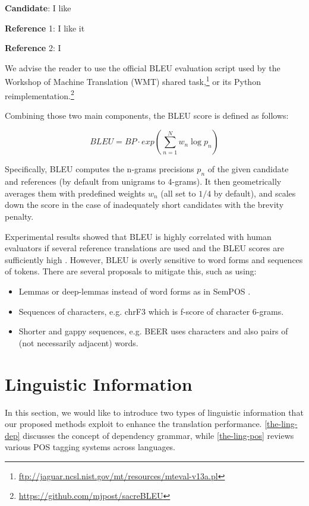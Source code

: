 \bigskip

\textbf{Candidate}: I like

\textbf{Reference} 1: I like it

\textbf{Reference} 2: I

\bigskip

We advise the reader to use the official BLEU evaluation script used by the Workshop of Machine Translation (WMT) shared task,\footnote{\url{ftp://jaguar.ncsl.nist.gov/mt/resources/mteval-v13a.pl}} or its Python reimplementation.\footnote{\url{https://github.com/mjpost/sacreBLEU}}

Combining those two main components, the BLEU score is defined as follows:

\begin{equation}
    BLEU=BP\cdot exp\left( \sum_{n=1}^{N} w_n \log p_n \right)
\end{equation}

Specifically, BLEU computes the n-grams precisions $p_n$ of the given candidate and references (by default from unigrams to 4-grams).
It then geometrically averages them with predefined weights $w_n$ (all set to $1/4$ by default), and scales down the score in the case of inadequately short candidates with the brevity penalty.

Experimental results showed that BLEU is highly correlated with human evaluators if several reference translations are used and the BLEU scores are sufficiently high \citep{bojar2010tackling}.
However, BLEU is overly sensitive to word forms and sequences of tokens.
There are several proposals to mitigate this, such as using:

\begin{itemize}
    \item Lemmas or deep-lemmas instead of word forms as in SemPOS \citep{Kos09evaluationof}.
    \item Sequences of characters, e.g. chrF3 \citep{chrf3} which is f-score of character 6-grams.
    \item Shorter and gappy sequences, e.g. BEER \citep{beer} uses characters and also pairs of (not necessarily adjacent) words.

\end{itemize}

\section{Linguistic Information}
\label{the-ling}

In this section, we would like to introduce two types of linguistic information that our proposed methods exploit to enhance the translation performance.
\cref{the-ling-dep} discusses the concept of dependency grammar, while \cref{the-ling-pos} reviews various POS tagging systems across languages.

